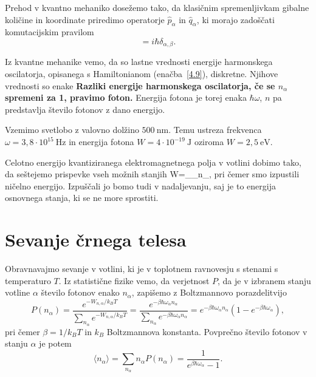 Prehod v kvantno mehaniko dosežemo tako, da klasičnim spremenljivkam gibalne količine
in koordinate priredimo operatorje $\hat{p}_{\alpha}$ in $\hat{q}_{\alpha}$,
ki morajo zadoščati komutacijskim pravilom 
\begin{equation}
[\hat{q}_{\alpha},\hat{p}_{\beta}]=i\hbar \delta_{\alpha, \beta}.
\label{4.10}
\end{equation}

Iz kvantne mehanike vemo, da so lastne vrednosti energije harmonskega oscilatorja, 
opisanega s Hamiltonianom (enačba~\ref{4.9}), diskretne. Njihove vrednosti so enake
{\bf Razliki energije harmonskega oscilatorja, če se $n_{\alpha}$
spremeni za 1, pravimo foton.} Energija
fotona je torej enaka $\hbar \omega$, $n$ pa predstavlja število fotonov z dano energijo.

\begin{remark}
Vzemimo svetlobo z valovno dolžino $500~\si{\nano\metre}$. Temu ustreza frekvenca
$\omega = 3,8 \cdot 10^{15}~\si{\hertz}$ in energija fotona $W = 4 \cdot 10^{-19}~\si{\joule}$
oziroma $W = 2,5~\mathrm{e}\si{\volt}$.
\end{remark}

Celotno energijo kvantiziranega elektromagnetnega polja v votlini
dobimo tako, da seštejemo prispevke vseh možnih stanjih
\beq
W=\sum_{\alpha}\hbar\omega_{\alpha}n_{\alpha},
\eeq
pri čemer smo izpustili ničelno energijo. 
Izpuščali jo bomo tudi v nadaljevanju, saj
je to energija osnovnega stanja, ki se ne more sprostiti. 

\section{Sevanje črnega telesa}
Obravnavajmo sevanje v votlini, ki je v toplotnem ravnovesju s stenami s temperaturo
$T$. Iz statistične fizike vemo, da verjetnost $P$, da je v izbranem stanju 
votline $\alpha$ število fotonov enako $n_{\alpha}$, zapišemo z Boltzmannovo porazdelitvijo
\begin{equation}
P(n_{\alpha})=\frac{e^{-W_{n,\alpha}/k_BT}}{\sum_{n_{\alpha}}e^{-W_{n,\alpha}/k_BT}} = 
\frac{e^{-\beta\hbar\omega_{\alpha}n_{\alpha}}}
{\sum_{n_{\alpha}}e^{-\beta\hbar\omega_{\alpha}n_{\alpha}}}=
e^{-\beta\hbar\omega_{\alpha}n_{\alpha}}(1-e^{-\beta\hbar\omega_{\alpha}}),
\label{4.12}
\end{equation}
pri čemer $\beta = 1/k_BT$ in $k_B$ Boltzmannova konstanta. Povprečno število fotonov 
v stanju $\alpha$ je potem
\begin{equation}
\langle n_{\alpha}\rangle =\sum_{n_{\alpha}}n_{\alpha}P(n_{\alpha})=\frac{1}{e^{\beta\hbar\omega_{\alpha}}-1}.
\label{4.13}
\end{equation}

